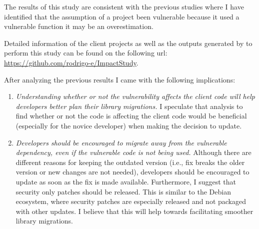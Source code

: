 The results of this study are consistent with the previous studies where I have identified that the assumption of a project been vulnerable because it used a vulnerable function it may be an overestimation.

Detailed information of the client projects as well as the outputs generated by \tool[] to perform this study can be found on the following url: \url{https://github.com/rodrigo-e/ImpactStudy}.

After analyzing the previous results I came with the following implications:
\begin{enumerate}
    \item \textit{Understanding whether or not the vulnerability affects the client code will help developers better plan their library migrations.}
    I speculate that analysis to find whether or not the code is affecting the client code would be beneficial (especially for the novice developer) when making the decision to update. 

    \item \textit{Developers should be encouraged to migrate away from the vulnerable dependency, even if the vulnerable code is not being used.}
    Although there are different reasons for keeping the outdated version (i.e., fix breaks the older version or new changes are not needed), developers should be encouraged to update as soon as the fix is made available.
    Furthermore, I suggest that security only patches should be released.
    This is similar to the Debian ecosystem, where security patches are especially released and not packaged with other updates.
    I believe that this will help towards facilitating smoother library migrations.
\end{enumerate}